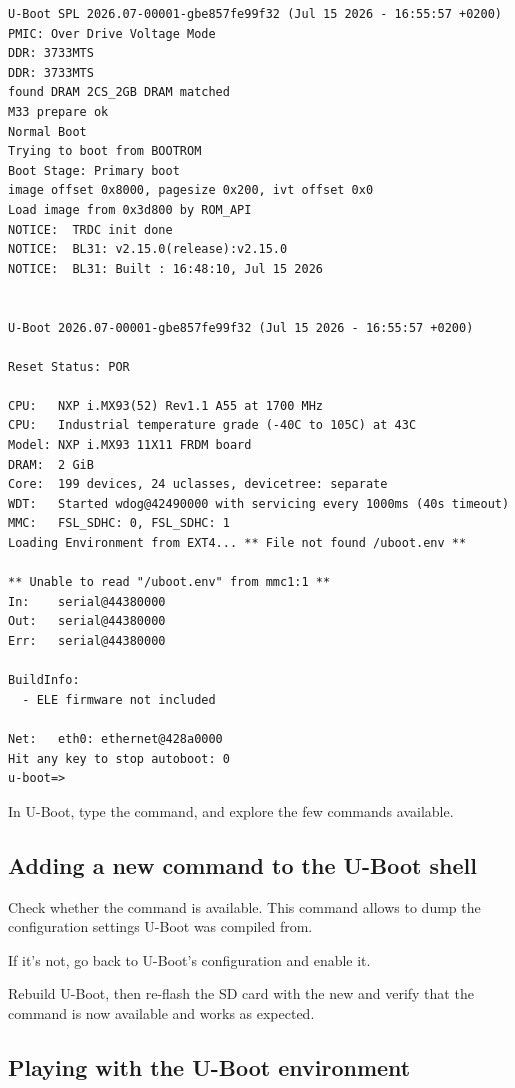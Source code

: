 \begin{verbatim}
U-Boot SPL 2026.07-00001-gbe857fe99f32 (Jul 15 2026 - 16:55:57 +0200)
PMIC: Over Drive Voltage Mode
DDR: 3733MTS
DDR: 3733MTS
found DRAM 2CS_2GB DRAM matched
M33 prepare ok
Normal Boot
Trying to boot from BOOTROM
Boot Stage: Primary boot
image offset 0x8000, pagesize 0x200, ivt offset 0x0
Load image from 0x3d800 by ROM_API
NOTICE:  TRDC init done
NOTICE:  BL31: v2.15.0(release):v2.15.0
NOTICE:  BL31: Built : 16:48:10, Jul 15 2026


U-Boot 2026.07-00001-gbe857fe99f32 (Jul 15 2026 - 16:55:57 +0200)

Reset Status: POR

CPU:   NXP i.MX93(52) Rev1.1 A55 at 1700 MHz
CPU:   Industrial temperature grade (-40C to 105C) at 43C
Model: NXP i.MX93 11X11 FRDM board
DRAM:  2 GiB
Core:  199 devices, 24 uclasses, devicetree: separate
WDT:   Started wdog@42490000 with servicing every 1000ms (40s timeout)
MMC:   FSL_SDHC: 0, FSL_SDHC: 1
Loading Environment from EXT4... ** File not found /uboot.env **

** Unable to read "/uboot.env" from mmc1:1 **
In:    serial@44380000
Out:   serial@44380000
Err:   serial@44380000

BuildInfo:
  - ELE firmware not included

Net:   eth0: ethernet@428a0000
Hit any key to stop autoboot: 0
u-boot=>
\end{verbatim}

In U-Boot, type the  command, and explore the few commands
available.

\subsection{Adding a new command to the U-Boot shell}

Check whether the  command is available. This command
allows to dump the configuration settings U-Boot was compiled from.

If it's not, go back to U-Boot's configuration and enable it.

Rebuild U-Boot, then re-flash the SD card with the new
 and verify that the command is now available and
works as expected.

\subsection{Playing with the U-Boot environment}

